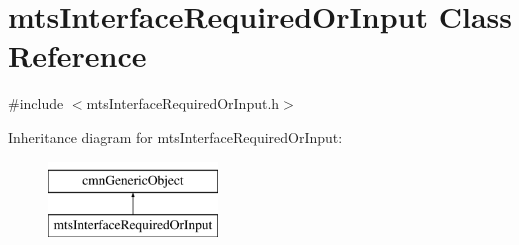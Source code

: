 \hypertarget{classmts_interface_required_or_input}{\section{mts\-Interface\-Required\-Or\-Input Class Reference}
\label{classmts_interface_required_or_input}
}


{\ttfamily \#include $<$mts\-Interface\-Required\-Or\-Input.\-h$>$}

Inheritance diagram for mts\-Interface\-Required\-Or\-Input\-:\begin{figure}[H]
\begin{center}
\leavevmode
\includegraphics[height=2.000000cm]{de/dcd/classmts_interface_required_or_input}
\end{center}
\end{figure}
